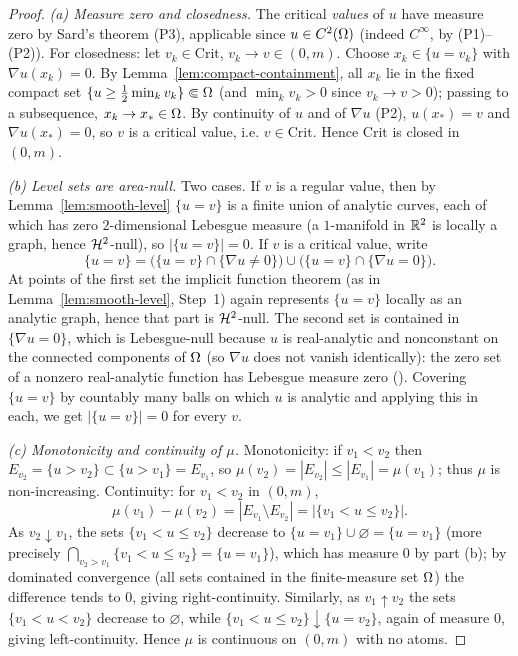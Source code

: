 \begin{proof}
\emph{(a) Measure zero and closedness.}
The critical \emph{values} of $u$ have measure zero by Sard's theorem (P3),
applicable since $u\in C^2(\Omega)$ (indeed $C^\infty$, by (P1)--(P2)). For
closedness: let $v_k\in\mathrm{Crit}$, $v_k\to v\in(0,m)$. Choose
$x_k\in\{u=v_k\}$ with $\nabla u(x_k)=0$. By
Lemma~\ref{lem:compact-containment}, all $x_k$ lie in the fixed compact set
$\{u\ge \tfrac{1}{2}\min_k v_k\}\Subset\Omega$ (and $\min_k v_k>0$ since
$v_k\to v>0$); passing to a subsequence, $x_k\to x_*\in\Omega$. By continuity of
$u$ and of $\nabla u$ (P2), $u(x_*)=v$ and $\nabla u(x_*)=0$, so $v$ is a
critical value, i.e. $v\in\mathrm{Crit}$. Hence $\mathrm{Crit}$ is closed in
$(0,m)$.

\emph{(b) Level sets are area-null.}
Two cases. If $v$ is a regular value, then by Lemma~\ref{lem:smooth-level}
$\{u=v\}$ is a finite union of analytic curves, each of which has zero
$2$-dimensional Lebesgue measure (a $1$-manifold in $\mathbb{R}^2$ is locally a graph,
hence $\mathcal{H}^2$-null), so $|\{u=v\}|=0$. If $v$ is a critical value, write
\[
  \{u=v\}=\bigl(\{u=v\}\cap\{\nabla u\ne0\}\bigr)\cup\bigl(\{u=v\}\cap\{\nabla u=0\}\bigr).
\]
At points of the first set the implicit function theorem (as in
Lemma~\ref{lem:smooth-level}, Step~1) again represents $\{u=v\}$ locally as an
analytic graph, hence that part is $\mathcal{H}^2$-null. The second set is contained in
$\{\nabla u=0\}$, which is Lebesgue-null because $u$ is real-analytic and
nonconstant on the connected components of $\Omega$ (so $\nabla u$ does not vanish
identically): the zero set of a nonzero real-analytic function has Lebesgue
measure zero (\cite[Lemma in \S0; or the analytic zero-set theorem]{KrantzParks2002}).
Covering $\{u=v\}$ by countably many balls on which $u$ is analytic and applying
this in each, we get $|\{u=v\}|=0$ for every $v$.

\emph{(c) Monotonicity and continuity of $\mu$.}
Monotonicity: if $v_1<v_2$ then $E_{v_2}=\{u>v_2\}\subset\{u>v_1\}=E_{v_1}$, so
$\mu(v_2)=|E_{v_2}|\le|E_{v_1}|=\mu(v_1)$; thus $\mu$ is non-increasing.
Continuity: for $v_1<v_2$ in $(0,m)$,
\[
  \mu(v_1)-\mu(v_2)=|E_{v_1}\setminus E_{v_2}|=|\{v_1<u\le v_2\}|.
\]
As $v_2\downarrow v_1$, the sets $\{v_1<u\le v_2\}$ decrease to
$\{u=v_1\}\cup\varnothing=\{u=v_1\}$ (more precisely
$\bigcap_{v_2>v_1}\{v_1<u\le v_2\}=\{u=v_1\}$), which has measure $0$ by part
(b); by dominated convergence (all sets contained in the finite-measure set
$\Omega$) the difference tends to $0$, giving right-continuity. Similarly, as
$v_1\uparrow v_2$ the sets $\{v_1<u<v_2\}$ decrease to $\varnothing$, while
$\{v_1<u\le v_2\}\downarrow\{u=v_2\}$, again of measure $0$, giving
left-continuity. Hence $\mu$ is continuous on $(0,m)$ with no atoms.
\end{proof}

